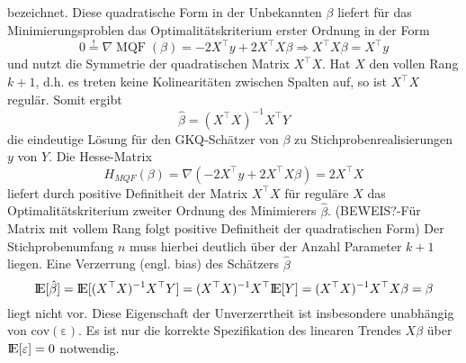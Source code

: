 bezeichnet. Diese quadratische Form in der Unbekannten $\beta$ liefert für das Minimierungsproblen das 
Optimalitätskriterium erster Ordnung in der Form
\begin{equation*}
    0 \overset{!}{=} \nabla \operatorname{MQF}(\beta)= -2 X^{\top} y + 2 X^{\top} X \beta \Rightarrow X^{\top} X \beta=X^{\top} y
\end{equation*}
und nutzt die Symmetrie der quadratischen Matrix $X^{\top}X$. 
Hat $X$ den vollen Rang $k+1$, d.h. es treten keine Kolinearitäten zwischen Spalten auf, 
so ist $X^{\top}X$ regulär. Somit ergibt
\begin{equation}
    \hat{\beta} = (X^{\top}X)^{-1} X^{\top} Y
\end{equation}
die eindeutige Lösung für den GKQ-Schätzer von $\beta$ zu Stichprobenrealisierungen $y$ von $Y$. 
Die Hesse-Matrix
\begin{equation*}
    H_{MQF}(\beta)=\nabla (-2 X^{\top} y + 2 X^{\top} X \beta) = 2 X^{\top} X
\end{equation*}
liefert durch positive Definitheit der Matrix $X^{\top} X$ für reguläre $X$ das
Optimalitätskriterium zweiter Ordnung des Minimierers $\hat{\beta}$.
(BEWEIS?-Für Matrix mit vollem Rang folgt positive Definitheit der quadratischen Form)
Der Stichprobenumfang $n$ muss hierbei deutlich über der Anzahl Parameter $k+1$ liegen.
Eine Verzerrung (engl. bias) des Schätzers $\hat{\beta}$ 
\begin{equation*}
    {\rm I\!E}[\hat{\beta}]={\rm I\!E}[(X^{\top}X)^{-1} X^{\top} Y] = 
    (X^{\top}X)^{-1} X^{\top} {\rm I\!E}[Y] = (X^{\top}X)^{-1} X^{\top} X \beta = \beta
\end{equation*}
liegt nicht vor. Diese Eigenschaft der Unverzerrtheit ist 
insbesondere unabhängig von $\operatorname{cov(\varepsilon)}$. Es ist nur die korrekte 
Spezifikation des linearen Trendes $X \beta$ über ${\rm I\!E}[\varepsilon]=0$ notwendig.

